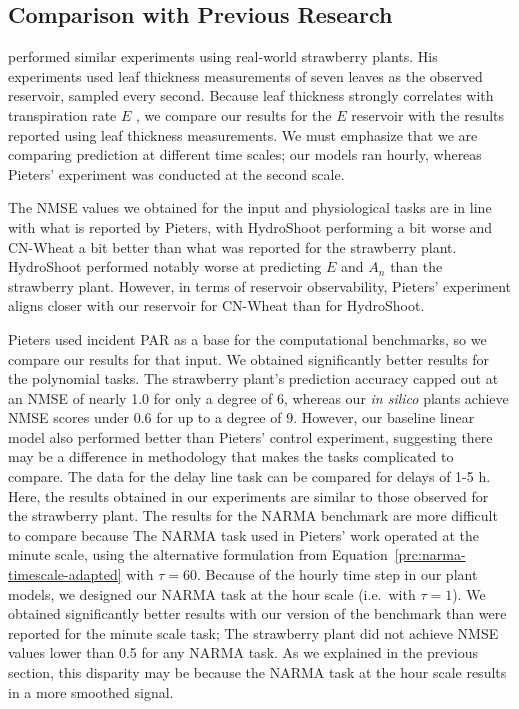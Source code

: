 \subsection{Comparison with Previous Research}

\citet{pieters_reservoir_2022} performed similar experiments using real-world strawberry plants.
His experiments used leaf thickness measurements of seven leaves as the observed reservoir, sampled every second.
Because leaf thickness strongly correlates with transpiration rate $E$ \citep{giuliani_coordination_2013}, we compare our results for the $E$ reservoir with the results reported using leaf thickness measurements.
We must emphasize that we are comparing prediction at different time scales; our models ran hourly, whereas Pieters' experiment was conducted at the second scale.

    The NMSE values we obtained for the input and physiological tasks are in line with what is reported by Pieters, with HydroShoot performing a bit worse and CN-Wheat a bit better than what was reported for the strawberry plant.
HydroShoot performed notably worse at predicting $E$ and $A_n$ than the strawberry plant.
However, in terms of reservoir observability, Pieters' experiment aligns closer with our reservoir for CN-Wheat than for HydroShoot.


Pieters used incident PAR as a base for the computational benchmarks, so we compare our results for that input.
We obtained significantly better results for the polynomial tasks.
The strawberry plant's prediction accuracy capped out at an NMSE of nearly 1.0 for only a degree of 6, whereas our \textit{in silico} plants achieve NMSE scores under 0.6 for up to a degree of 9.
However, our baseline linear model also performed better than Pieters' control experiment, suggesting there may be a difference in methodology that makes the tasks complicated to compare. 
The data for the delay line task can be compared for delays of 1-5 \unit{\hour}. 
Here, the results obtained in our experiments are similar to those observed for the strawberry plant.
The results for the NARMA benchmark are more difficult to compare because The NARMA task used in Pieters' work operated at the minute scale, using the alternative formulation from \mbox{Equation \ref{prc:narma-timescale-adapted}} with $\tau=60$.
Because of the hourly time step in our plant models, we designed our NARMA task at the hour scale (i.e.\ with $\tau=1$).
We obtained significantly better results with our version of the benchmark than were reported for the minute scale task; 
The strawberry plant did not achieve NMSE values lower than 0.5 for any NARMA task.
As we explained in the previous section, this disparity may be because the NARMA task at the hour scale results in a more smoothed signal.

